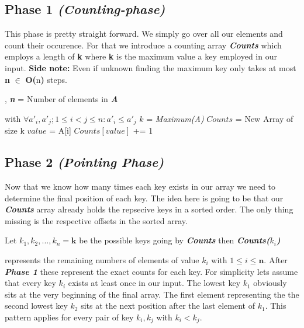\documentclass{article}
\newcommand{\upperbound}[1]{
    \textbf{O(}#1\textbf{)}
}
\newcommand{\variable}[1]{
    \textit{\textbf{#1}}
}
\begin{document}
        \subsection{Phase 1 \textit{(Counting-phase)}}
        This phase is pretty straight forward. We simply go over all our elements and count their occurence. For that we introduce a counting array\variable{Counts} which employs a length of \textbf{k} where \textbf{k} is the
        maximum value a key employed in our input. \textbf{Side note:} Even if unknown finding the maximum key only takes at most \textbf{n} $\in$\upperbound{n} steps.
        \begin{algorithmic}
            \Input{\variable{A} = [$a_1,a_2,...,a_n$]}, \variable{n} = Number of elements in\variable{A}
            \Output{\variable{A'} = [$a'_1,a'_2,...,a'_n$]} with $\forall a'_i,a'_j; 1 \leq i < j\leq n:a'_i\leq a'_j$
                \State$k$ = \textit{Maximum(A)}
                \State$Counts$ = New Array of size k
                \State
                        \State$value$ = A[i]
                        \State$Counts[value]$ += 1
                    \EndFor
                \State[...]
            \EndFunction
        \end{algorithmic}
        
        \subsection{Phase 2 \textit{(Pointing Phase)}}
        Now that we know how many times each key exists in our array we need to determine the final position of each
        key. The idea here is going to be that our\variable{Counts} array already holds the repsecive keys in a sorted
        order. The only thing missing is the respective offsets in the sorted array.
        
        Let $k_1, k_2,...,k_n=\textbf{k}$ be the possible keys going by\variable{Counts} then \variable{Counts($k_i$)}
        represents the remaining numbers of elements of value $k_i$ with $1 \leq i \leq \textbf{n}$. After \textit{\textbf{Phase 1}} these represent the exact counts for each key. For simplicity lets assume that
        every key $k_i$ exists at least once in our input. The lowest key $k_1$ obviously sits at the very beginning
        of the final array. The first element representing the the second lowest key $k_2$ sits at the next position
        after the last element of $k_1$. This pattern applies for every pair of key $k_i,k_j$ with $k_i < k_j$.
        
\end{document}
